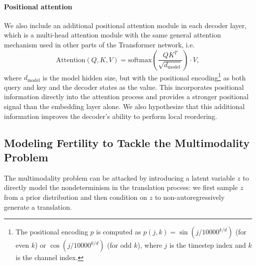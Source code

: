\documentclass{article} %
\begin{document}
\vspace{-5pt}
\paragraph{Positional attention}
We also include an additional positional attention module in each decoder layer, which is a multi-head attention module with the same general attention mechanism used in other parts of the Transformer network, i.e.
\begin{equation}
\text{Attention}(Q,K,V)=\text{softmax}\left(\frac{QK^T}{\sqrt{d_\text{model}}}\right)\cdot V,
\label{eq.attention}
\end{equation}
where $d_\text{model}$ is the model hidden size, but with the positional encoding\footnote{The positional encoding $p$ is computed as $p(j, k) =
\sin{(j/10000^{k/d})}$ (for even $k$) or $\cos{(j/10000^{k/d})}$ (for odd $k$), where $j$ is the timestep index and $k$ is the channel index.} as both query and key and the decoder states as the value. This incorporates positional information directly into the attention process and provides a stronger positional signal than the embedding layer alone. We also hypothesize that this additional information improves the decoder's ability to perform local reordering.

\subsection{Modeling Fertility to Tackle the Multimodality Problem}
\label{sec.fertility}

The multimodality problem can be attacked by introducing a latent variable $z$ to directly model the nondeterminism in the translation process: we first sample $z$ from a prior distribution and then condition on $z$ to non-autoregressively generate a translation.
\end{document}

